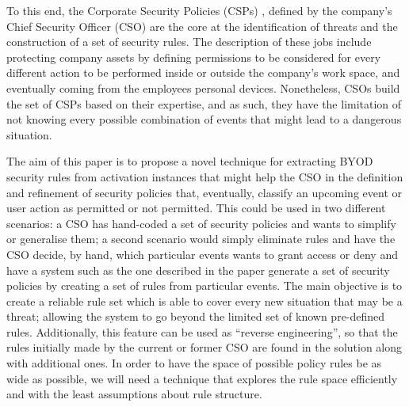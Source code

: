 \documentclass[a4paper,10pt,twocolumn,preprint,3p]{elsarticle}
\begin{document}
To this end, the Corporate Security Policies (CSPs) \cite{Kaeo:2003:DNS:1201807}, 
defined by the company's Chief Security Officer (CSO) are the core at
the %
identification of threats and the construction of a set of security rules. The description of these jobs include protecting
company assets by defining permissions to be considered for every
different action to be performed inside or outside the company's work
space, and eventually coming from the employees personal
devices. Nonetheless, CSOs build the set of CSPs based on their
expertise, and as such, they have the limitation of not knowing every
possible combination of events that might lead to a dangerous
situation. 

The aim of this paper is to propose a novel technique for extracting
BYOD security rules from activation instances that might help the CSO in the definition and refinement
of security policies that, eventually, classify an upcoming
event or user action as permitted or not permitted. This could be used
in two different scenarios: a CSO has hand-coded a set of security
policies and wants to simplify or generalise them; a second scenario
would simply eliminate rules and have the CSO decide, by hand, which
particular events wants to grant access or deny and have a system such
as the one described in the paper generate a set of security policies
by creating a set of rules from particular events. 
The main objective is to create a reliable rule set
which is able to cover every new situation that may be a threat;
allowing the system to go beyond the limited set of known pre-defined
rules. Additionally, this feature can be used as ``reverse
engineering'', so that the rules initially made by the current or
former CSO are found in the solution along with additional ones. In
order to have the space of possible policy rules be as wide 
as possible, we will need a technique that explores the rule space
efficiently and with the least assumptions about rule structure.
\end{document}
